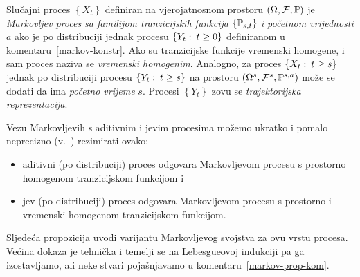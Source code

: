 \documentclass[main.tex]{subfiles}
\begin{document}
\begin{definicija}
	Slučajni proces \( \left\{ X_t \right\} \) definiran na vjerojatnosnom prostoru \( \left( \Omega, \mathcal F, \P \right) \) je \emph{Markovljev proces sa familijom tranzicijskih funkcija} \( \left\{ \Ptrans_{s, t} \right\} \) \emph{i početnom vrijednosti} \( a \) ako je po distribuciji jednak procesu \( \left\{ Y_t \st t \ge 0 \right\} \) definiranom u komentaru~\ref{markov-konstr}. Ako su tranzicijske funkcije vremenski homogene, i sam proces naziva se \emph{vremenski homogenim}. Analogno, za proces
	\( \left\{ X_t \st t \ge s \right\} \) jednak po distribuciji procesu \( \left\{ Y_t \st t \ge s\right\} \)
	na prostoru \( \left( \Omega^s, \mathcal F^s, \P^{s,a} \right) \) može se dodati da ima \emph{početno vrijeme} \( s \). Procesi \( \left\{ Y_t \right\} \) zovu se \emph{trajektorijska reprezentacija}.
\end{definicija}

Vezu Markovljevih s aditivnim i \levy jevim procesima možemo ukratko i pomalo neprecizno
(v.~\cite[]{sato}) rezimirati ovako:
\begin{itemize}
	\item aditivni (po distribuciji) proces odgovara Markovljevom procesu s prostorno homogenom tranzicijskom funkcijom i
	\item \levy jev (po distribuciji) proces odgovara Markovljevom procesu s prostorno i vremenski homogenom tranzicijskom funkcijom.
\end{itemize}

Sljedeća propozicija uvodi varijantu Markovljevog svojstva za ovu vrstu procesa.
Većina dokaza je tehnička i temelji se na Lebesgueovoj indukciji pa ga izostavljamo,
ali neke stvari pojašnjavamo u komentaru~\ref{markov-prop-kom}.
\end{document}
